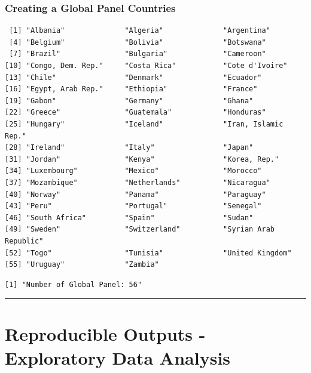 \documentclass[
  11pt,
]{article}
\begin{document}
\hypertarget{creating-a-global-panel-countries}{%
\subsubsection{Creating a Global Panel
Countries}\label{creating-a-global-panel-countries}}

\begin{verbatim}
 [1] "Albania"              "Algeria"              "Argentina"           
 [4] "Belgium"              "Bolivia"              "Botswana"            
 [7] "Brazil"               "Bulgaria"             "Cameroon"            
[10] "Congo, Dem. Rep."     "Costa Rica"           "Cote d'Ivoire"       
[13] "Chile"                "Denmark"              "Ecuador"             
[16] "Egypt, Arab Rep."     "Ethiopia"             "France"              
[19] "Gabon"                "Germany"              "Ghana"               
[22] "Greece"               "Guatemala"            "Honduras"            
[25] "Hungary"              "Iceland"              "Iran, Islamic Rep."  
[28] "Ireland"              "Italy"                "Japan"               
[31] "Jordan"               "Kenya"                "Korea, Rep."         
[34] "Luxembourg"           "Mexico"               "Morocco"             
[37] "Mozambique"           "Netherlands"          "Nicaragua"           
[40] "Norway"               "Panama"               "Paraguay"            
[43] "Peru"                 "Portugal"             "Senegal"             
[46] "South Africa"         "Spain"                "Sudan"               
[49] "Sweden"               "Switzerland"          "Syrian Arab Republic"
[52] "Togo"                 "Tunisia"              "United Kingdom"      
[55] "Uruguay"              "Zambia"              
\end{verbatim}

\begin{verbatim}
[1] "Number of Global Panel: 56"
\end{verbatim}

\begin{center}\rule{0.5\linewidth}{0.5pt}\end{center}

\hypertarget{reproducible-outputs---exploratory-data-analysis}{%
\section{Reproducible Outputs - Exploratory Data
Analysis}\label{reproducible-outputs---exploratory-data-analysis}}
\end{document}
